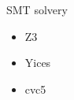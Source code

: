 \begin{frame}{SMT solvery}
	\begin{itemize}
		\item Z3
		\item Yices
		\item cvc5
	\end{itemize}
\end{frame}